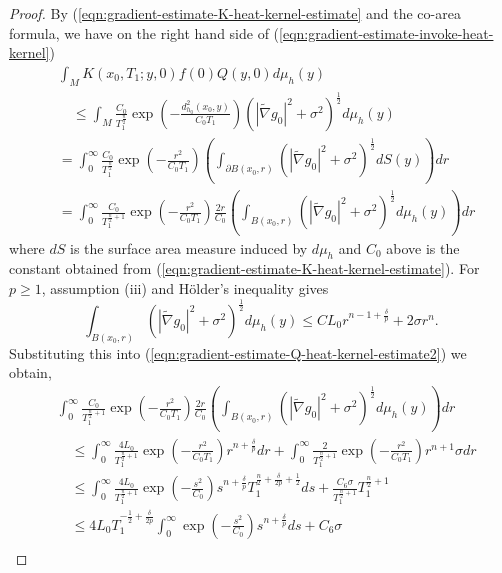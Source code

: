 \documentclass[12pt]{amsart}
\theoremstyle{plain}
\theoremstyle{plain}
\theoremstyle{definition}
\theoremstyle{remark}
\numberwithin{equation}{subsection}
\newcommand{\hdel}{\tilde{\nabla}}
\begin{document}
\begin{proof}
    By (\ref{eqn:gradient-estimate-K-heat-kernel-estimate} and the co-area formula, we have on the right hand side of (\ref{eqn:gradient-estimate-invoke-heat-kernel})
    \begin{align}\label{eqn:gradient-estimate-Q-heat-kernel-estimate2}
        &\int_{M} K(x_0, T_1; y, 0)f(0)Q(y,0)d\mu_h(y) \nonumber \\
        &\quad \leq \int_{M} \frac{C_0}{T_1^{\frac{n}{2}}}\exp\left(-\frac{d^2_{h_0}(x_0, y)}{C_0 T_1}\right)\left(|\hdel g_0|^2 + \sigma^2\right)^{\frac{1}{2}}d\mu_h(y) \nonumber \\
        &= \int_0^{\infty} \frac{C_0}{T_1^{\frac{n}{2}}}\exp\left(-\frac{r^2}{C_0 T_1}\right)\left(\int_{\partial B(x_0, r)}\left(|\hdel g_0|^2 + \sigma^2\right)^{\frac{1}{2}}dS(y)\right)dr \nonumber \\
        &= \int_0^{\infty} \frac{C_0}{T_1^{\frac{n}{2}+1}}\exp\left(-\frac{r^2}{C_0 T_1}\right)\frac{2r}{C_0}\left(\int_{B(x_0, r)}\left(|\hdel g_0|^2 + \sigma^2\right)^{\frac{1}{2}}d\mu_h(y)\right)dr
    \end{align}
    where $dS$ is the surface area measure induced by $d\mu_h$ and $C_0$ above is the constant obtained from (\ref{eqn:gradient-estimate-K-heat-kernel-estimate}). For $p \geq 1$, assumption (iii) and H\"older's inequality gives
    \begin{equation*}
        \int_{B(x_0, r)} \left(|\hdel g_0|^2 + \sigma^2\right)^{\frac{1}{2}}d\mu_h(y) \leq CL_0r^{n-1+\frac{\delta}{p}} + 2\sigma r^n.
    \end{equation*}
    Substituting this into (\ref{eqn:gradient-estimate-Q-heat-kernel-estimate2}) we obtain,
    \begin{align*}
        &\int_0^{\infty} \frac{C_0}{T_1^{\frac{n}{2}+1}}\exp\left(-\frac{r^2}{C_0 T_1}\right)\frac{2r}{C_0}\left(\int_{B(x_0, r)}\left(|\hdel g_0|^2 + \sigma^2\right)^{\frac{1}{2}}d\mu_h(y)\right)dr \nonumber \\
        &\quad \leq \int_0^{\infty} \frac{4L_0}{T_1^{\frac{n}{2}+1}}\exp\left(-\frac{r^2}{C_0 T_1}\right)r^{n+\frac{\delta}{p}}dr + \int_0^{\infty} \frac{2}{T_1^{\frac{n}{2}+1}}\exp\left(-\frac{r^2}{C_0 T_1}\right)r^{n+1}\sigma dr \nonumber \\
        &\quad \leq \int_0^{\infty} \frac{4L_0}{T_1^{\frac{n}{2}+1}}\exp\left(-\frac{s^2}{C_0}\right)s^{n +\frac{\delta}{p}}T_1^{\frac{n}{2}+\frac{\delta}{2p}+\frac{1}{2}}ds + \frac{C_6\sigma}{T_1^{\frac{n}{2}+1}}T_1^{\frac{n}{2}+1} \nonumber \\
        &\quad \leq 4L_0T_1^{-\frac{1}{2}+\frac{\delta}{2p}}\int_0^\infty\exp\left(-\frac{s^2}{C_0}\right)s^{n+\frac{\delta}{p}}ds + C_6\sigma \nonumber \\

\end{align*}
\end{proof}
\end{document}
